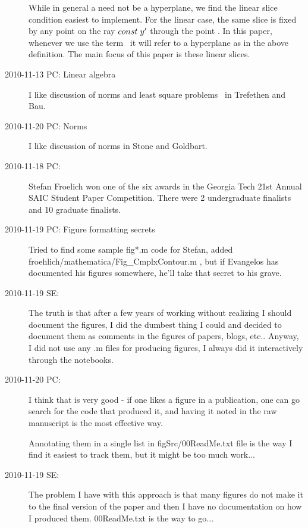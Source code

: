 \begin{description}
While in general a {\slice} need not be a hyperplane,
we find the linear slice condition  easiest to implement.
For the linear case, the same slice is fixed by any
point on the ray $const\; {y'}$ through the point \slicep.
In this paper, whenever we use the term \slice\ it will refer to a
hyperplane as in the above definition. The main focus of this paper is
these linear slices.

\item[2010-11-13 PC: Linear algebra]
I like discussion of norms and least square problems \etc\
in Trefethen and Bau.

\item[2010-11-20 PC: Norms]
I like discussion of norms in Stone and Goldbart.

\item[2010-11-18 PC:]
Stefan Froelich won one of the six awards in the Georgia Tech 21st Annual
SAIC Student Paper Competition. There were 2 undergraduate finalists and
10 graduate finalists.

\item[2010-11-19 PC: Figure formatting secrets]
Tried to find some sample fig*.m code for Stefan, added
froehlich/mathematica/Fig\_CmplxContour.m , but if Evangelos has
documented his figures somewhere, he'll take that secret to his grave.

\item[2010-11-19 SE:]
The truth is that after a few years of working without realizing I
should document the figures, I did the dumbest thing I could and
decided to document them as comments in the figures of papers, blogs,
etc..
Anyway, I did not use any .m files for producing figures, I always did
it interactively through the notebooks.

\item[2010-11-20 PC:] I think that is very good - if one likes a figure
in a publication, one can go search for the code that produced it, and
having it noted in the raw manuscript is the most effective way.

Annotating them in a single list in figSrc/00ReadMe.txt file is the way I
find it easiest to track them, but it might be too much work...

\item[2010-11-19 SE:]
The problem I have with this approach is that many figures do not make
it to the final version of the paper and then I have no documentation
on how I produced them. 00ReadMe.txt is the way to go...


\end{description}
